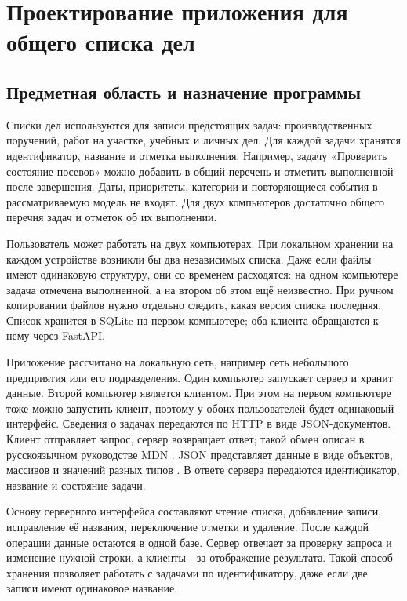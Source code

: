 \chapter{Проектирование приложения для общего списка дел}

\section{Предметная область и назначение программы}

Списки дел используются для записи предстоящих задач: производственных поручений, работ на участке, учебных и личных дел. Для каждой задачи хранятся идентификатор, название и отметка выполнения. Например, задачу «Проверить состояние посевов» можно добавить в общий перечень и отметить выполненной после завершения. Даты, приоритеты, категории и повторяющиеся события в рассматриваемую модель не входят. Для двух компьютеров достаточно общего перечня задач и отметок об их выполнении.

Пользователь может работать на двух компьютерах. При локальном хранении на каждом устройстве возникли бы два независимых списка. Даже если файлы имеют одинаковую структуру, они со временем расходятся: на одном компьютере задача отмечена выполненной, а на втором об этом ещё неизвестно. При ручном копировании файлов нужно отдельно следить, какая версия списка последняя. Список хранится в SQLite на первом компьютере; оба клиента обращаются к нему через FastAPI.

Приложение рассчитано на локальную сеть, например сеть небольшого предприятия или его подразделения. Один компьютер запускает сервер и хранит данные. Второй компьютер является клиентом. При этом на первом компьютере тоже можно запустить клиент, поэтому у обоих пользователей будет одинаковый интерфейс. Сведения о задачах передаются по HTTP в виде JSON-документов. Клиент отправляет запрос, сервер возвращает ответ; такой обмен описан в русскоязычном руководстве MDN \cite{mdnhttp}. JSON представляет данные в виде объектов, массивов и значений разных типов \cite{rfcjson}. В ответе сервера передаются идентификатор, название и состояние задачи.

Основу серверного интерфейса составляют чтение списка, добавление записи, исправление её названия, переключение отметки и удаление. После каждой операции данные остаются в одной базе. Сервер отвечает за проверку запроса и изменение нужной строки, а клиенты - за отображение результата. Такой способ хранения позволяет работать с задачами по идентификатору, даже если две записи имеют одинаковое название.

